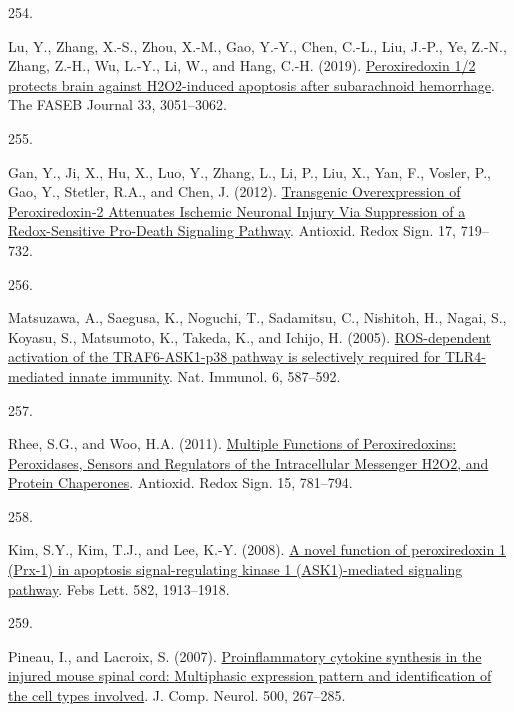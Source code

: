 \documentclass[
]{article}
\newlength{\cslhangindent}
\newlength{\csllabelwidth}
\newlength{\cslentryspacingunit} %
\newenvironment{CSLReferences}[2] %
 {%
  \setlength{\parindent}{0pt}
  \ifodd #1
  \let\oldpar\par
  \def\par{\hangindent=\cslhangindent\oldpar}
  \fi
  \setlength{\parskip}{#2\cslentryspacingunit}
 }%
 {}
\newcommand{\CSLLeftMargin}[1]{\parbox[t]{\csllabelwidth}{#1}}
\newcommand{\CSLRightInline}[1]{\parbox[t]{\linewidth - \csllabelwidth}{#1}\break}
\begin{document}
\begin{CSLReferences}{0}{0}
\leavevmode{}%
\CSLLeftMargin{254. }
\CSLRightInline{Lu, Y., Zhang, X.-S., Zhou, X.-M., Gao, Y.-Y., Chen, C.-L., Liu, J.-P., Ye, Z.-N., Zhang, Z.-H., Wu, L.-Y., Li, W., and Hang, C.-H. (2019). \href{https://doi.org/10.1096/fj.201801150R}{Peroxiredoxin 1/2 protects brain against {H2O2-induced} apoptosis after subarachnoid hemorrhage}. The FASEB Journal 33, 3051--3062.}

\leavevmode{}%
\CSLLeftMargin{255. }
\CSLRightInline{Gan, Y., Ji, X., Hu, X., Luo, Y., Zhang, L., Li, P., Liu, X., Yan, F., Vosler, P., Gao, Y., Stetler, R.A., and Chen, J. (2012). \href{https://doi.org/10.1089/ars.2011.4298}{Transgenic {Overexpression} of {Peroxiredoxin-2 Attenuates Ischemic Neuronal Injury Via Suppression} of a {Redox-Sensitive Pro-Death Signaling Pathway}}. Antioxid. Redox Sign. 17, 719--732.}

\leavevmode{}%
\CSLLeftMargin{256. }
\CSLRightInline{Matsuzawa, A., Saegusa, K., Noguchi, T., Sadamitsu, C., Nishitoh, H., Nagai, S., Koyasu, S., Matsumoto, K., Takeda, K., and Ichijo, H. (2005). \href{https://doi.org/10.1038/ni1200}{{ROS-dependent} activation of the {TRAF6-ASK1-p38} pathway is selectively required for {TLR4-mediated} innate immunity}. Nat. Immunol. 6, 587--592.}

\leavevmode{}%
\CSLLeftMargin{257. }
\CSLRightInline{Rhee, S.G., and Woo, H.A. (2011). \href{https://doi.org/10.1089/ars.2010.3393}{Multiple {Functions} of {Peroxiredoxins}: {Peroxidases}, {Sensors} and {Regulators} of the {Intracellular Messenger H2O2}, and {Protein Chaperones}}. Antioxid. Redox Sign. 15, 781--794.}

\leavevmode{}%
\CSLLeftMargin{258. }
\CSLRightInline{Kim, S.Y., Kim, T.J., and Lee, K.-Y. (2008). \href{https://doi.org/10.1016/j.febslet.2008.05.015}{A novel function of peroxiredoxin 1 ({Prx-1}) in apoptosis signal-regulating kinase 1 ({ASK1})-mediated signaling pathway}. Febs Lett. 582, 1913--1918.}

\leavevmode{}%
\CSLLeftMargin{259. }
\CSLRightInline{Pineau, I., and Lacroix, S. (2007). \href{https://doi.org/10.1002/cne.21149}{Proinflammatory cytokine synthesis in the injured mouse spinal cord: {Multiphasic} expression pattern and identification of the cell types involved}. J. Comp. Neurol. 500, 267--285.}


\end{CSLReferences}
\end{document}
